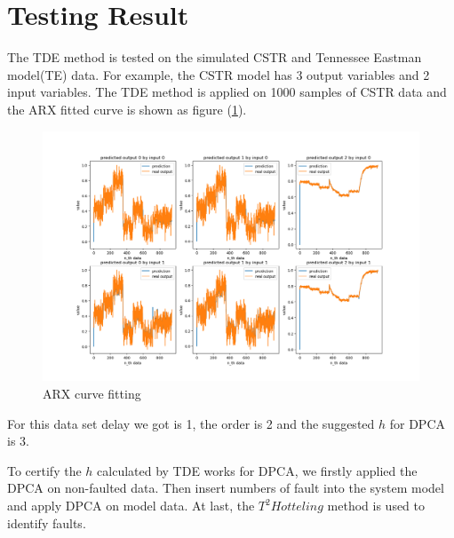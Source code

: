 \documentclass[letterpaper, 12 pt, Journal, onecolumn]{ieeeconf}  %
\begin{document}
\section{Testing Result}
The TDE method is tested on the simulated CSTR and Tennessee Eastman model(TE) data. For example, the CSTR model has 3 output variables and 2 input variables. The TDE method is applied on 1000 samples of CSTR data and the ARX fitted curve is shown as figure (\ref{fig:ARX_fitting}). 
\begin{figure}

	\begin{center}
	\includegraphics[scale=0.5]{cstr_arx_fit.png}
	\caption{ARX curve fitting}
	\label{fig:ARX_fitting}
	\end{center}
\end{figure}
For this data set delay we got is 1, the order is 2 and the suggested $h$ for DPCA is 3.


To certify the $h$ calculated by TDE works for DPCA, we firstly applied the DPCA on non-faulted data. Then insert numbers of fault into the system model and apply DPCA on model data. At last, the $T^2 Hotteling$ method is used to identify faults. 
\end{document}
